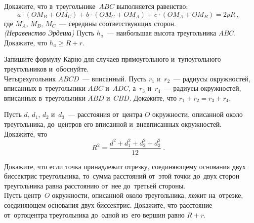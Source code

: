\begin{problems}
\item
\sp
Докажите, что в~треугольнике~$ABC$ выполняется равенство:
\[
    a \cdot (O M_B + O M_C)
    +
    b \cdot (O M_C + O M_A)
    +
    c \cdot (O M_A + O M_B)
=
    2 p R
\,,\]
где $M_A$, $M_B$, $M_C$~--- середины соответствующих сторон.
\\
\sp\emph{(Неравенство Эрдеша)}
Пусть $h_a$~--- наибольшая высота треугольника $ABC$.
Докажите, что $h_a \geq R + r$.

\item
\sp
Запишите формулу Карно для случаев прямоугольного и~тупоугольного треугольников
и~обоснуйте.
\\
\sp
Четырехугольник $ABCD$~--- вписанный.
Пусть $r_1$ и~$r_2$~--- радиусы окружностей, вписанных в~треугольники $ABC$
и~$ADC$, а~$r_3$ и~$r_4$~--- радиусы окружностей, вписанных в~треугольники
$ABD$ и~$CBD$.
Докажите, что $r_1 + r_2 = r_3 + r_4$.

\item
Пусть $d$, $d_1$, $d_2$ и~$d_3$~--- расстояния от~центра $O$ окружности,
описанной около треугольника, до~центров его вписанной и~вневписанных
окружностей.
Докажите, что
\[
    R^2
=
    \frac{d^2 + d_1^2 + d_2^2 + d_3^2}{12}
\;.\]

\item
\sp
Докажите, что если точка принадлежит отрезку, соединяющему основания двух
биссектрис треугольника, то~сумма расстояний от~этой точки до~двух сторон
треугольника равна расстоянию от~нее до~третьей стороны.
\\
\sp
Пусть центр~$O$ окружности, описанной около треугольника, лежит на~отрезке,
соединяющем основания двух биссектрис.
Докажите, что расстояние от~ортоцентра треугольника до~одной из~его вершин
равно $R + r$.

\end{problems}

